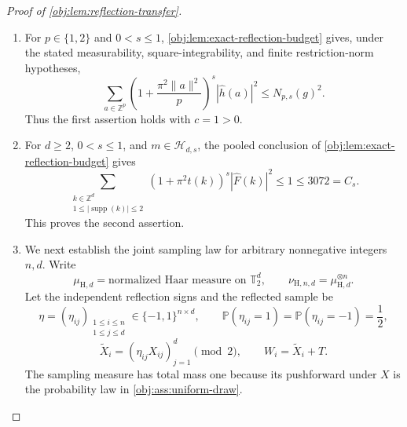 \begin{proof}[Proof of \cref{obj:lem:reflection-transfer}]
\begin{enumerate}
\item For \(p\in\{1,2\}\) and \(0<s\leq1\), \cref{obj:lem:exact-reflection-budget} gives, under the stated measurability, square-integrability, and finite restriction-norm hypotheses,
\[
\sum_{a\in\mathbb Z^p}
\left(1+\frac{\pi^2\|a\|^2}{p}\right)^s
|\widehat h(a)|^2
\leq N_{p,s}(g)^2.
\]
Thus the first assertion holds with \(c=1>0\).

\item For \(d\geq2\), \(0<s\leq1\), and
\(m\in\mathcal H_{d,s}\), the pooled conclusion of
\cref{obj:lem:exact-reflection-budget} gives
\[
\sum_{\substack{k\in\mathbb Z^d\\
1\leq|\operatorname{supp}(k)|\leq2}}
(1+\pi^2t(k))^s|\widehat F(k)|^2
\leq1\leq3072=C_s.
\]
This proves the second assertion.

\item We next establish the joint sampling law for arbitrary nonnegative
integers \(n,d\). Write
\[
\mu_{\mathrm H,d}
=\text{normalized Haar measure on }\mathbb T_2^d,
\qquad
\nu_{\mathrm H,n,d}=\mu_{\mathrm H,d}^{\otimes n}.
\]
Let the independent reflection signs and the reflected sample be
\[
\eta=(\eta_{ij})_{\substack{1\leq i\leq n\\1\leq j\leq d}}
\in\{-1,1\}^{n\times d},
\qquad
\mathbb P(\eta_{ij}=1)=\mathbb P(\eta_{ij}=-1)=\frac12,
\]
\[
\widetilde X_i=(\eta_{ij}X_{ij})_{j=1}^d
\pmod{2},
\qquad
W_i=\widetilde X_i+T.
\]
The sampling measure has total mass one because its pushforward under
\(X\) is the probability law in \cref{obj:ass:uniform-draw}.


\end{enumerate}
\end{proof}
